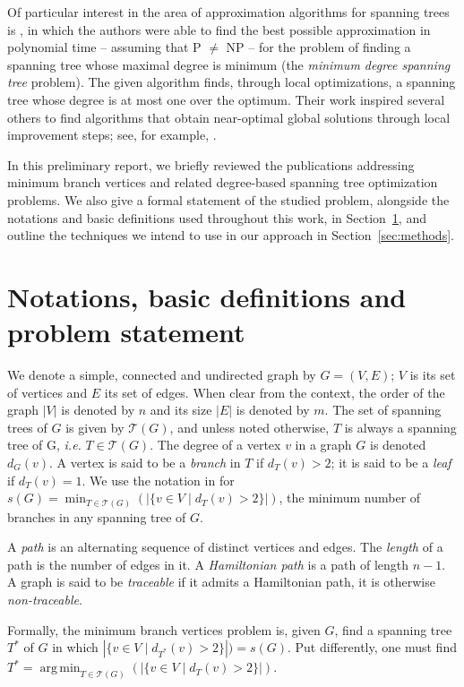 \documentclass[12pt]{article}
\DeclareMathOperator*{\argmin}{arg\,min}
\begin{document}
Of particular interest in the area of approximation algorithms for spanning trees is \cite{furer1992}, in which the authors were able to find the best possible approximation in polynomial time -- assuming that P $\neq$ NP -- for the problem of finding a spanning tree whose maximal degree is minimum (the \emph{minimum degree spanning tree} problem).
The given algorithm finds, through local optimizations, a spanning tree whose degree is at most one over the optimum. 
Their work inspired several others to find algorithms that obtain near-optimal global solutions through local improvement steps; see, for example, \cite{salamon2010, lu1996, chimani2015}.

In this preliminary report, we briefly reviewed the publications addressing minimum branch vertices and related degree-based spanning tree optimization problems.
We also give a formal statement of the studied problem, alongside the notations and basic definitions used throughout this work, in Section~\ref{sec:notations}, and outline the techniques we intend to use in our approach in Section~\ref{sec:methods}.

\section{Notations, basic definitions and problem statement} \label{sec:notations}

We denote a simple, connected and undirected graph by $G = (V, E)$; $V$ is its set of vertices and $E$ its set of edges.
When clear from the context, the order of the graph $|V|$ is denoted by $n$ and its size $|E|$ is denoted by $m$.
The set of spanning trees of $G$ is given by $\mathcal{T}(G)$, and unless noted otherwise, $T$ is always a spanning tree of G, \emph{i.e.} $T \in \mathcal{T}(G)$.
The degree of a vertex $v$ in a graph $G$ is denoted $d_G(v)$.
A vertex is said to be a \emph{branch} in $T$ if $d_T(v) > 2$; it is said to be a \emph{leaf} if $d_T(v) = 1$.
We use the notation in \cite{gargano2004} for $s(G) = \min_{T \in \mathcal{T}(G)}(|\{v \in V \mid d_T(v) > 2 \}|)$, the minimum number of branches in any spanning tree of $G$.

A \emph{path} is an alternating sequence of distinct vertices and edges.
The \emph{length} of a path is the number of edges in it.
A \emph{Hamiltonian path} is a path of length $n - 1$.
A graph is said to be \emph{traceable} if it admits a Hamiltonian path, it is otherwise \emph{non-traceable}.

Formally, the minimum branch vertices problem is, given $G$, find a spanning tree $T^*$ of $G$ in which $|\{v \in V \mid d_{T^*}(v) > 2 \}|) = s(G)$.
Put differently, one must find $T^* = \argmin_{T \in \mathcal{T}(G)}(|\{ v \in V \mid d_T(v) > 2\}|)$.
\end{document}
